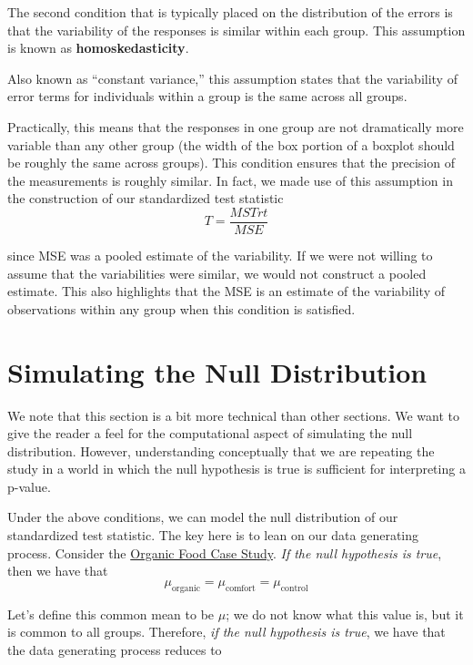 \documentclass[]{book}
\theoremstyle{definition}
\theoremstyle{definition}
\theoremstyle{definition}
\theoremstyle{remark}
\let\BeginKnitrBlock\begin \let\EndKnitrBlock\end
\begin{document}
The second condition that is typically placed on the distribution of the
errors is that the variability of the responses is similar within each
group. This assumption is known as \textbf{homoskedasticity}.

\BeginKnitrBlock{definition}[Homoskedasticity]
\protect\hypertarget{def:defn-homoskedasticity}{}{\label{def:defn-homoskedasticity}
{} }Also known as ``constant variance,''
this assumption states that the variability of error terms for
individuals within a group is the same across all groups.
\EndKnitrBlock{definition}

Practically, this means that the responses in one group are not
dramatically more variable than any other group (the width of the box
portion of a boxplot should be roughly the same across groups). This
condition ensures that the precision of the measurements is roughly
similar. In fact, we made use of this assumption in the construction of
our standardized test statistic \[T = \frac{MSTrt}{MSE}\]

since MSE was a pooled estimate of the variability. If we were not
willing to assume that the variabilities were similar, we would not
construct a pooled estimate. This also highlights that the MSE is an
estimate of the variability of observations within any group when this
condition is satisfied.

\section{Simulating the Null
Distribution}\label{simulating-the-null-distribution}

We note that this section is a bit more technical than other sections.
We want to give the reader a feel for the computational aspect of
simulating the null distribution. However, understanding conceptually
that we are repeating the study in a world in which the null hypothesis
is true is sufficient for interpreting a p-value.

Under the above conditions, we can model the null distribution of our
standardized test statistic. The key here is to lean on our data
generating process. Consider the \protect\hyperlink{CaseOrganic}{Organic
Food Case Study}. \emph{If the null hypothesis is true}, then we have
that
\[\mu_{\text{organic}} = \mu_{\text{comfort}} = \mu_{\text{control}}\]

Let's define this common mean to be \(\mu\); we do not know what this
value is, but it is common to all groups. Therefore, \emph{if the null
hypothesis is true}, we have that the data generating process reduces to
\end{document}
